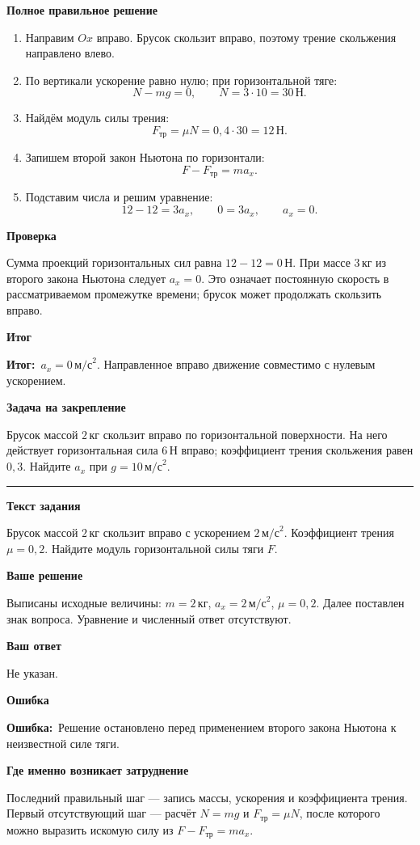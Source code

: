 \documentclass[a4paper,12pt]{article}
\newcommand{\reviewtitle}[1]{\noindent{\Large\bfseries\color{deepaccent}Задание №#1}\par\vspace{2mm}\noindent\rule{\linewidth}{0.35pt}\vspace{2mm}}
\newcommand{\subblock}[1]{\par\medskip\textbf{\color{deepaccent}#1}\par\vspace{-2pt}}
\newcommand{\errorlabel}{\textcolor{errorred}{\textbf{Ошибка:}}}
\newcommand{\resultlabel}{\textcolor{deepaccent}{\textbf{Итог:}}}
\begin{document}
\subblock{Полное правильное решение}
\begin{enumerate}
\item Направим $Ox$ вправо. Брусок скользит вправо, поэтому трение скольжения направлено влево.
\item По вертикали ускорение равно нулю; при горизонтальной тяге:
\[N-mg=0,\qquad N=3\cdot10=30\,\text{Н}.\]
\item Найдём модуль силы трения:
\[F_{\text{тр}}=\mu N=0{,}4\cdot30=12\,\text{Н}.\]
\item Запишем второй закон Ньютона по горизонтали:
\[F-F_{\text{тр}}=ma_x.\]
\item Подставим числа и решим уравнение:
\[12-12=3a_x,\qquad 0=3a_x,\qquad\boxed{a_x=0}.\]
\end{enumerate}

\subblock{Проверка}
Сумма проекций горизонтальных сил равна $12-12=0\,\text{Н}$. При массе $3\,\text{кг}$ из второго закона Ньютона следует $a_x=0$. Это означает постоянную скорость в рассматриваемом промежутке времени; брусок может продолжать скользить вправо.

\subblock{Итог}
\resultlabel\ $\boxed{a_x=0\,\text{м/с}^2}$. Направленное вправо движение совместимо с нулевым ускорением.

\subblock{Задача на закрепление}
Брусок массой $2\,\text{кг}$ скользит вправо по горизонтальной поверхности. На него действует горизонтальная сила $6\,\text{Н}$ вправо; коэффициент трения скольжения равен $0{,}3$. Найдите $a_x$ при $g=10\,\text{м/с}^2$.

\clearpage
{}\label{task:9}
\reviewtitle{9}
\subblock{Текст задания}
Брусок массой $2\,\text{кг}$ скользит вправо с ускорением $2\,\text{м/с}^2$. Коэффициент трения $\mu=0{,}2$. Найдите модуль горизонтальной силы тяги $F$.

\subblock{Ваше решение}
Выписаны исходные величины: $m=2\,\text{кг}$, $a_x=2\,\text{м/с}^2$, $\mu=0{,}2$. Далее поставлен знак вопроса. Уравнение и численный ответ отсутствуют.

\subblock{Ваш ответ}
Не указан.

\subblock{Ошибка}
\errorlabel\ Решение остановлено перед применением второго закона Ньютона к неизвестной силе тяги.

\subblock{Где именно возникает затруднение}
Последний правильный шаг --- запись массы, ускорения и коэффициента трения. Первый отсутствующий шаг --- расчёт $N=mg$ и $F_{\text{тр}}=\mu N$, после которого можно выразить искомую силу из $F-F_{\text{тр}}=ma_x$.
\end{document}
